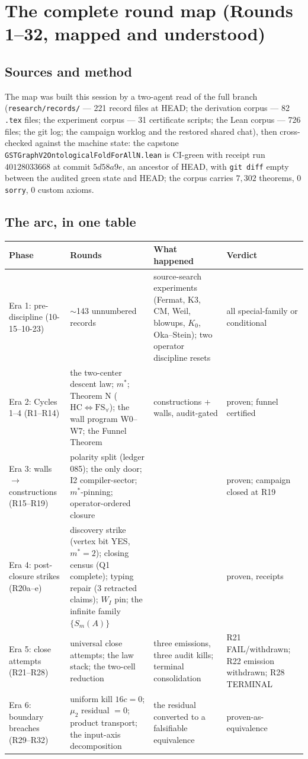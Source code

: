\documentclass[11pt]{article}
\begin{document}
\section{The complete round map (Rounds 1--32, mapped and understood)}

\subsection*{Sources and method}
The map was built this session by a two-agent read of the full branch
(\texttt{research/records/} --- 221 record files at HEAD; the derivation
corpus --- 82 \texttt{.tex} files; the experiment corpus --- 31 certificate
scripts; the Lean corpus --- 726 files; the git log; the campaign worklog and
the restored shared chat), then cross-checked against the machine state:
the capstone \texttt{GSTGraphV2OntologicalFoldForAllN.lean} is CI-green with
receipt run $40128033668$ at commit $5d58a9e$, an ancestor of HEAD, with
\texttt{git diff} empty between the audited green state and HEAD; the corpus
carries $7{,}302$ theorems, $0$ \texttt{sorry}, $0$ custom axioms.

\subsection*{The arc, in one table}

\begin{center}
\small
\begin{tabular}{@{}p{2.6cm}p{4.4cm}p{4.2cm}p{3.6cm}@{}}
\toprule
\textbf{Phase} & \textbf{Rounds} & \textbf{What happened} & \textbf{Verdict} \\
\midrule
Era 1: pre-discipline (10-15--10-23) & $\sim$143 unnumbered records & source-search experiments (Fermat, K3, CM, Weil, blowups, $K_0$, Oka--Stein); two operator discipline resets & all special-family or conditional \\
Era 2: Cycles 1--4 (R1--R14) & the two-center descent law; $m^*$; Theorem N ($\mathrm{HC}\Leftrightarrow\mathrm{FS}_\forall$); the wall program W0--W7; the Funnel Theorem & constructions + walls, audit-gated & proven; funnel certified \\
Era 3: walls$\to$constructions (R15--R19) & polarity split (ledger 085); the only door; I2 compiler-sector; $m^*$-pinning; operator-ordered closure & & proven; campaign closed at R19 \\
Era 4: post-closure strikes (R20a--e) & discovery strike (vertex bit YES, $m^*=2$); closing census (Q1 complete); typing repair (3 retracted claims); $W_I$ pin; the infinite family $\{S_m(A)\}$ & & proven, receipts \\
Era 5: close attempts (R21--R28) & universal close attempts; the law stack; the two-cell reduction & three emissions, three audit kills; terminal consolidation & R21 FAIL/withdrawn; R22 emission withdrawn; R28 TERMINAL \\
Era 6: boundary breaches (R29--R32) & uniform kill $16c=0$; $\mu_2$ residual $=0$; product transport; the input-axis decomposition & the residual converted to a falsifiable equivalence & proven-as-equivalence \\
\bottomrule
\end{tabular}
\end{center}
\end{document}
